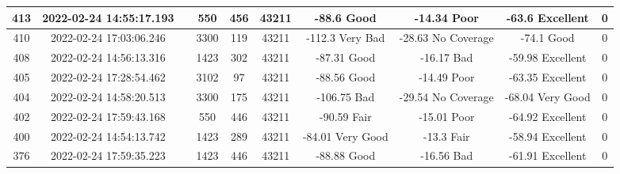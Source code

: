 \begin{longtable*}{|c|c|c|c|c|c|c|c|c|c|}
413&2022-02-24 14:55:17.193&&550&456&43211& -88.6     Good        & -14.34    Poor        & -63.6     Excellent   & 0\\\hline
{}410&2022-02-24 17:03:06.246&&3300&119&43211& -112.3    Very Bad    & -28.63    No Coverage & -74.1     Good        & 0\\\hline
{}408&2022-02-24 14:56:13.316&&1423&302&43211& -87.31    Good        & -16.17    Bad         & -59.98    Excellent   & 0\\\hline
{}405&2022-02-24 17:28:54.462&&3102&97&43211& -88.56    Good        & -14.49    Poor        & -63.35    Excellent   & 0\\\hline
{}404&2022-02-24 14:58:20.513&&3300&175&43211& -106.75   Bad         & -29.54    No Coverage & -68.04    Very Good   & 0\\\hline
{}402&2022-02-24 17:59:43.168&&550&446&43211& -90.59    Fair        & -15.01    Poor        & -64.92    Excellent   & 0\\\hline
{}400&2022-02-24 14:54:13.742&&1423&289&43211& -84.01    Very Good   & -13.3     Fair        & -58.94    Excellent   & 0\\\hline
{}376&2022-02-24 17:59:35.223&&1423&446&43211& -88.88    Good        & -16.56    Bad         & -61.91    Excellent   & 0\\\hline

\end{longtable*}
